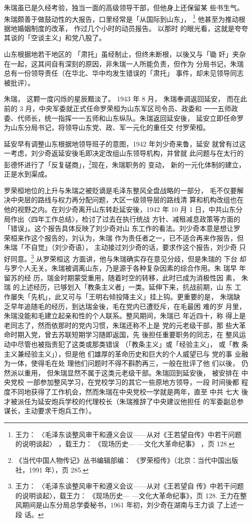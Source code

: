 朱瑞虽已是久经考验，独当一面的高级领导干部，但他身上还保留某
些书生气。朱瑞颇善于做鼓动性的大报告，口里经常是「从国际到山东」，
\footnote{王力：
〈毛泽东谈整风审干和遵义会议——从对《王若望自传》中若干问题的说明谈起〉
，载王力：
《现场历史—
—文化大革命纪事》
，页 128.}
他甚至为推动根据地婚姻制度的改革，
作过几个小时的动员报告。
以那时
的眼光看，这就是夸夸其谈的「空谈主义」和党八股了。

山东根据地若干地区的
「肃托」虽经制止，但终未断根，以後又与「锄
奸」夹杂在一起，这其间自有深刻的原因，非朱瑞一人所能负责，但作为
分局书记，朱瑞总有一份领导责任（在华北、华中均发生错误的「肃托」
事件，却未见领导同志被批评）。

朱瑞，
这颗一度闪烁的星辰黯淡了。
1943 年 8 月，
朱瑞奉调返回延安，
而在此前的 3 月，中央军委就正式任命罗荣桓为山东军区司令员、政委和
一一五师政委、代师长，统一指挥一一五师和山东纵队。朱瑞返回延安後，
延安立即任命罗为山东分局书记，将领导山东党、政、军一元化的重任交
付罗荣桓。

延安早有调整山东根据地领导班子的意图，1942 年刘少奇来鲁，延安 就曾有过这
一考虑，刘少奇返延安後毛即决定改组山东领导机构，并曾就 此问题与在太行的
彭德怀进行了「反复磋商」，\footnote{《当代中国人物传记》丛书编辑部编：
《罗荣桓传》（北京：当代中国出版社，1991 年），页 285.}现在，朱瑞职务的
变动， 新的一元化体制的建立，正是水到渠成。
 
罗荣桓地位的上升与朱瑞之被贬谪是毛泽东整风全盘战略的一部分， 毛不仅要解
决中央层的路线与权力再分配问题，大区一级领导层的路线清 算和机构改组也在
他的视野之内。在刘少奇离开山东转赴延安後，1942 年 10 月 1 日，中共山东分
局作出〈四年工作总结〉，检讨了过去在执行统战 方针、减租减息政策等方面的
「错误」。这个报告具体反映了刘少奇对山 东工作的看法。刘少奇本意是想让罗
荣桓来作这个报告的，刘认为，朱瑞 作为责任者之一，已不适合再来作报告，但
朱瑞「不自觉」（刘少奇语）， 主动接过刘少奇的话，要求作这个报告，刘少奇
只好同意。\footnote{王力： 〈毛泽东谈整风审干和遵义会议——从对《王若望自
传》中若干问题的说明谈起〉，载王力： 《现场历史— —文化大革命纪事》，页
128. 王力在整风期间是山东分局总学委秘书，1961 年初，刘少奇在湖南与王力谈
了上述一段 话。} 从罗荣桓这 方面讲，他与朱瑞确实存在意见分歧，但是朱瑞的
下台 却与罗个人无关。朱瑞被调离山东，乃是源于各种复杂因素的综合作用。朱
瑞早 年留苏的经 历，瑞金时期蒙受重用，随着时空的转移，此时已成为消极性因
素， 朱瑞 的上述经历，已够划入「教条主义者」一类。延伸下来，抗战前期，山
东 工 作屡失「先机」，此又可与「王明右倾投降主义」挂上钩。更重要的是，
朱瑞缺 乏早年追随毛的经历，到达瑞金後，毛在党内已遭贬斥，在毛最困 难的岁
月里， 朱瑞没能和毛建立起亲和性的个人联系。整风期间，朱瑞已 年近四十，称
得上是 老同志了，然而依那时的党内习惯，朱瑞还称不上是 党的元老级干部，那
些大革 命时期入党，曾去苏联短期学习随即返国，先 後担任重要职务的同志，在
整风运 动中尽管也被指责犯了这类或那类错误 （「教条主义」或「经验主义」，
或「教 条主义兼经验主义」），但是他 们雄厚的革命历史和巨大的个人威望已与
党的事 业融为一体，使得毛在处 理他们问题时不得不斟酌再三，一般在批评了他
们以後， 仍然派以重用， 但朱瑞显然不属于这类元老级干部。朱瑞回到延安後，
被安排在 中央党校 一部参加整风学习，在党校学习的其它一些原地方领导，一段
时间後都 程 度不同地获得了工作机会，然而朱瑞在中央党校一学就是两年，直至
中共 七大 後才被派任为延安炮兵学校的代理校长（朱瑞推辞了中央建议他担任
的军委副总参谋长，主动要求干炮兵工作）。

